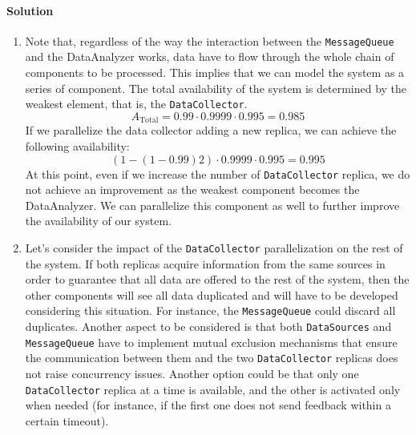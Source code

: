 \paragraph*{Solution}
\begin{enumerate}
    \item Note that, regardless of the way the interaction between the \texttt{MessageQueue} and the DataAnalyzer works, data have to flow through the whole chain of components to be processed. 
        This implies that we can model the system as a series of component.
        The total availability of the system is determined by the weakest element, that is, the \texttt{DataCollector}.
        \[A_{\text{Total}} = 0.99 \cdot 0.9999 \cdot 0.995 = 0.985\]
        If we parallelize the data collector adding a new replica, we can achieve the following availability:
        \[(1-(1-0.99)2) \cdot 0.9999 \cdot 0.995 = 0.995\]
        At this point, even if we increase the number of \texttt{DataCollector} replica, we do not achieve an improvement as the weakest component becomes the DataAnalyzer.
        We can parallelize this component as well to further improve the availability of our system.
    \item Let's consider the impact of the \texttt{DataCollector} parallelization on the rest of the system.
        If both replicas acquire information from the same sources in order to guarantee that all data are offered to the rest of the system, then the other components will see all data duplicated and will have to be developed considering this situation. 
        For instance, the \texttt{MessageQueue} could discard all duplicates. 
        Another aspect to be considered is that both \texttt{DataSources} and \texttt{MessageQueue} have to implement mutual exclusion mechanisms that ensure the communication between them and the two \texttt{DataCollector} replicas does not raise concurrency issues. 
        Another option could be that only one \texttt{DataCollector} replica at a time is available, and the other is activated only when needed (for instance, if the first one does not send feedback within a certain timeout).
\end{enumerate}

